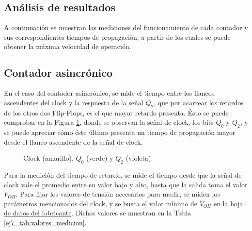 \subsection{An\'alisis de resultados}
\noindent
A continuaci\'on se muestran las mediciones del funcionamiento de cada contador y sus correspondientes tiempos de propagaci\'on, a partir de los cuales se puede obtener la m\'axima velocidad de operaci\'on.
%
\subsection{Contador asincr\'onico}
\label{ej7_sec:meas_cont_asinc}
\noindent
En el caso del contador asincr\'onico, se mide el tiempo entre los flancos ascendentes del clock y la respuesta de la señal $Q_2$, que por acarrear los retardos de los otros dos Flip-Flops, es el que mayor retardo presenta. \'Esto se puede comprobar en la Figura \ref{ej7_fig:asinc_0vs2}, donde se observan la señal de clock, los bits $Q_0$ y $Q_2$, y se puede apreciar c\'omo \'este \'ultimo presenta un tiempo de propagaci\'on mayor desde el flanco ascendente de la señal de clock.
%
\begin{figure}[H]
	\centering
	\caption{Clock (amarillo), $Q_0$ (verde) y $Q_2$ (violeta).}
	\label{ej7_fig:asinc_0vs2}
\end{figure}
%
\noindent
Para la medici\'on del tiempo de retardo, se mide el tiempo desde que la señal de clock vale el promedio entre su valor bajo y alto, hasta que la salida toma el valor $V_{OH}$. Para fijar los valores de tensi\'on necesarios para medir, se miden los par\'ametros mencionados del clock, y se busca el valor m\'inimo de $V_{OH}$ en la \href{https://www.ti.com/lit/ds/symlink/sn74s74.pdf}{hoja de datos del fabricante}. Dichos valores se muestran en la Tabla \ref{ej7_tab:valores_medicion}.
